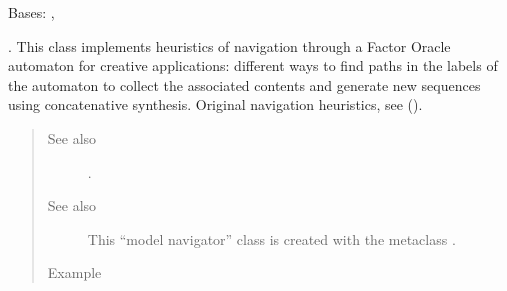\documentclass[letterpaper,10pt,english]{sphinxmanual}
\begin{document}
\begin{fulllineitems}
\label{\detokenize{index:ModelNavigator.FactorOracleNavigator}}
Bases: {\hyperref[\detokenize{index:Model.FactorOracle}]{}}, {\hyperref[\detokenize{index:Navigator.Navigator}]{}}

.
This class implements heuristics of navigation through a Factor Oracle automaton for creative applications: 
different ways to find paths in the labels of the automaton to collect the associated contents and generate new sequences using concatenative synthesis.
Original navigation heuristics, see  ().
\begin{quote}\begin{description}
\item[{See also}] \leavevmode
{} .

\item[{See also}] \leavevmode
This “model navigator” class is created with the metaclass {\hyperref[\detokenize{index:MetaModelNavigator.MetaModelNavigator}]{}}.

\item[{Example}] \leavevmode
\end{description}\end{quote}


\end{fulllineitems}
\end{document}
